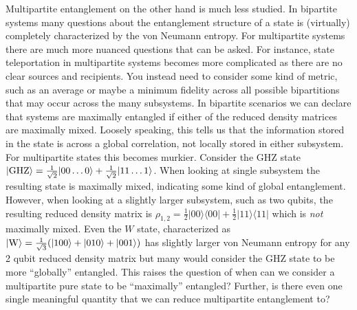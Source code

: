 \documentclass{article}
\newcommand{\ket}[1]{|#1\rangle}
\newcommand{\bra}[1]{\langle #1|}
\newcommand{\ketbra}[2]{| #1\rangle\! \langle #2|}
\begin{document}
Multipartite entanglement on the other hand is much less studied. In bipartite systems many questions about the entanglement structure of a state is (virtually) completely characterized by the von Neumann entropy. For multipartite systems there are much more nuanced questions that can be asked. For instance, state teleportation in multipartite systems becomes more complicated as there are no clear sources and recipients. You instead need to consider some kind of metric, such as an average or maybe a minimum fidelity across all possible bipartitions that may occur across the many subsystems. In bipartite scenarios we can declare that systems are maximally entangled if either of the reduced density matrices are maximally mixed. Loosely speaking, this tells us that the information stored in the state is across a global correlation, not locally stored in either subsystem. For multipartite states this becomes murkier. Consider the GHZ state $\ket{\rm GHZ} = \frac{1}{\sqrt{2}} \ket{00\ldots0} + \frac{1}{\sqrt{2}} \ket{1 1\ldots1}$. When looking at single subsystem the resulting state is maximally mixed, indicating some kind of global entanglement. However, when looking at a slightly larger subsystem, such as two qubits, the resulting reduced density matrix is $\rho_{1,2} = \frac{1}{2} \ketbra{00}{00} + \frac{1}{2} \ketbra{11}{11}$ which is \emph{not} maximally mixed. Even the $W$ state, characterized as $\ket{\rm W} = \frac{1}{\sqrt{3}}(\ket{100} + \ket{010} + \ket{001})$ has slightly larger von Neumann entropy for any 2 qubit reduced density matrix but many would consider the GHZ state to be more ``globally'' entangled. This raises the question of when can we consider a multipartite pure state to be ``maximally'' entangled? Further, is there even one single meaningful quantity that we can reduce multipartite entanglement to?


\end{document}
